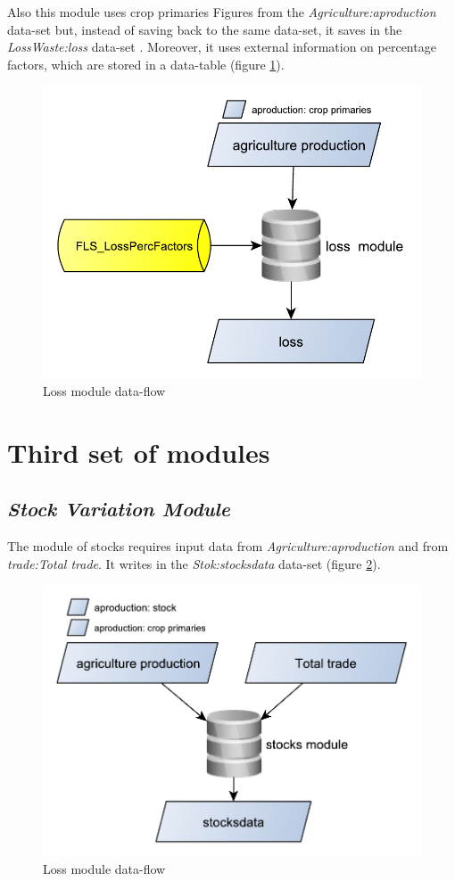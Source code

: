 \documentclass[]{article}
\begin{document}
Also this module uses crop primaries Figures from the
\emph{Agriculture:aproduction} data-set but, instead of saving back to
the same data-set, it saves in the \emph{LossWaste:loss} data-set .
Moreover, it uses external information on percentage factors, which are
stored in a data-table (figure \ref{fig:f12}).

\begin{figure}[H]

{\centering \includegraphics[width=0.45\linewidth]{images/SwsFbs/12_loss} 

}

\caption{\label{fig:f12}Loss module data-flow}\label{fig:f12}
\end{figure}

\section{Third set of modules}\label{third-set-of-modules}

\subsection{\texorpdfstring{\emph{Stock Variation
Module}}{Stock Variation Module}}\label{stock-variation-module}

The module of stocks requires input data from
\emph{Agriculture:aproduction} and from \emph{trade:Total trade}. It
writes in the \emph{Stok:stocksdata} data-set (figure \ref{fig:f13}).

\begin{figure}[H]

{\centering \includegraphics[width=0.45\linewidth]{images/SwsFbs/13_stock} 

}

\caption{\label{fig:f13}Loss module data-flow}\label{fig:f13}
\end{figure}
\end{document}
